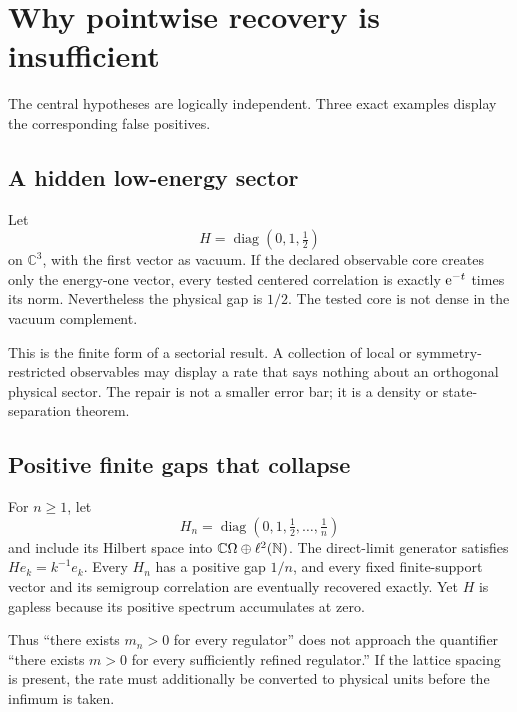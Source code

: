 \section{Why pointwise recovery is insufficient}
\label{sec:countermodels}

The central hypotheses are logically independent.  Three exact examples
display the corresponding false positives.

\subsection{A hidden low-energy sector}

\begin{counterexample}
\label{ex:hidden}
Let
\[
 H=\operatorname{diag}(0,1,\tfrac12)
\]
on $\mathbb C^3$, with the first vector as vacuum.  If the declared observable
core creates only the energy-one vector, every tested centered correlation is
exactly $\mathrm e^{-t}$ times its norm.  Nevertheless the physical gap is
$1/2$.  The tested core is not dense in the vacuum complement.
\end{counterexample}

This is the finite form of a sectorial result.  A collection of local or
symmetry-restricted observables may display a rate that says nothing about an
orthogonal physical sector.  The repair is not a smaller error bar; it is a
density or state-separation theorem.

\subsection{Positive finite gaps that collapse}

\begin{counterexample}
\label{ex:collapse}
For $n\geq1$, let
\[
 H_n=\operatorname{diag}(0,1,\tfrac12,\ldots,\tfrac1n)
\]
and include its Hilbert space into
$\mathbb C\Omega\oplus\ell^2(\mathbb N)$.  The direct-limit generator satisfies
$H e_k=k^{-1}e_k$.  Every $H_n$ has a positive gap $1/n$, and every fixed
finite-support vector and its semigroup correlation are eventually recovered
exactly.  Yet $H$ is gapless because its positive spectrum accumulates at
zero.
\end{counterexample}

Thus ``there exists $m_n>0$ for every regulator'' does not approach the
quantifier ``there exists $m>0$ for every sufficiently refined regulator.''
If the lattice spacing is present, the rate must additionally be converted to
physical units before the infimum is taken.


